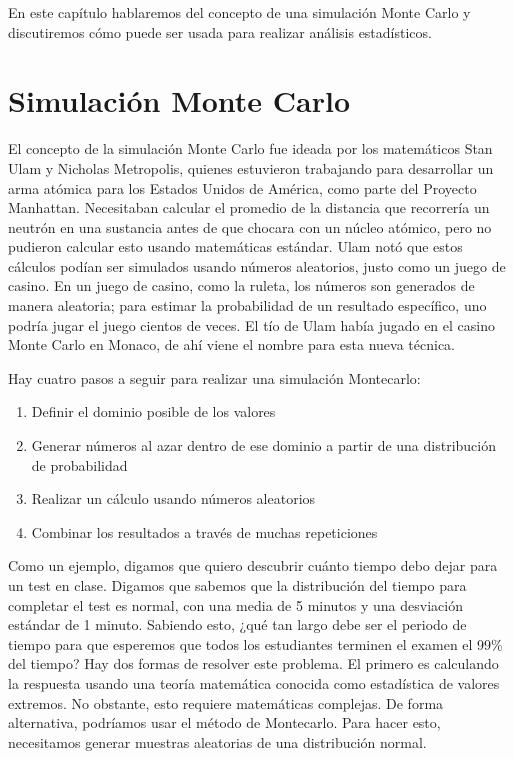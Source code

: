 \documentclass[
  12pt,
]{book}
\providecommand{\tightlist}{%
  \setlength{\itemsep}{0pt}\setlength{\parskip}{0pt}}
\theoremstyle{definition}
\theoremstyle{definition}
\theoremstyle{definition}
\theoremstyle{remark}
\begin{document}
En este capítulo hablaremos del concepto de una simulación Monte Carlo y discutiremos cómo puede ser usada para realizar análisis estadísticos.

\hypertarget{simulaciuxf3n-monte-carlo}{%
\section{Simulación Monte Carlo}\label{simulaciuxf3n-monte-carlo}}

El concepto de la simulación Monte Carlo fue ideada por los matemáticos Stan Ulam y Nicholas Metropolis, quienes estuvieron trabajando para desarrollar un arma atómica para los Estados Unidos de América, como parte del Proyecto Manhattan. Necesitaban calcular el promedio de la distancia que recorrería un neutrón en una sustancia antes de que chocara con un núcleo atómico, pero no pudieron calcular esto usando matemáticas estándar. Ulam notó que estos cálculos podían ser simulados usando números aleatorios, justo como un juego de casino. En un juego de casino, como la ruleta, los números son generados de manera aleatoria; para estimar la probabilidad de un resultado específico, uno podría jugar el juego cientos de veces. El tío de Ulam había jugado en el casino Monte Carlo en Monaco, de ahí viene el nombre para esta nueva técnica.

Hay cuatro pasos a seguir para realizar una simulación Montecarlo:

\begin{enumerate}
\def\labelenumi{\arabic{enumi}.}
\tightlist
\item
  Definir el dominio posible de los valores
\item
  Generar números al azar dentro de ese dominio a partir de una distribución de probabilidad
\item
  Realizar un cálculo usando números aleatorios
\item
  Combinar los resultados a través de muchas repeticiones
\end{enumerate}

Como un ejemplo, digamos que quiero descubrir cuánto tiempo debo dejar para un test en clase. Digamos que sabemos que la distribución del tiempo para completar el test es normal, con una media de 5 minutos y una desviación estándar de 1 minuto. Sabiendo esto, ¿qué tan largo debe ser el periodo de tiempo para que esperemos que todos los estudiantes terminen el examen el 99\% del tiempo? Hay dos formas de resolver este problema. El primero es calculando la respuesta usando una teoría matemática conocida como estadística de valores extremos. No obstante, esto requiere matemáticas complejas. De forma alternativa, podríamos usar el método de Montecarlo. Para hacer esto, necesitamos generar muestras aleatorias de una distribución normal.
\end{document}
